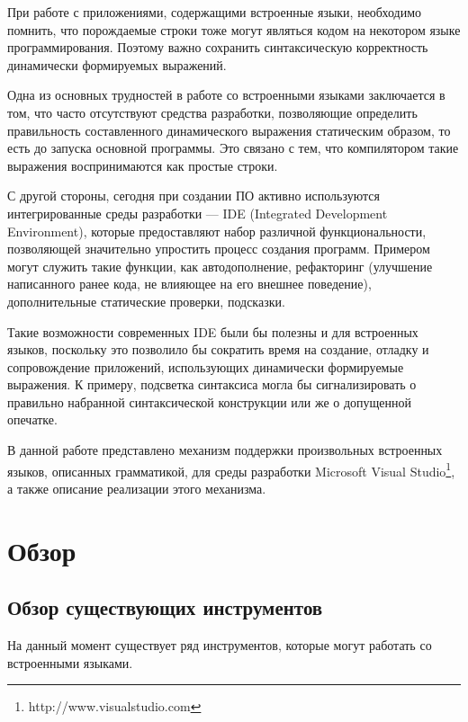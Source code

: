 При работе с приложениями, содержащими встроенные языки, необходимо помнить, что порождаемые строки тоже могут являться кодом на некотором языке программирования. Поэтому важно сохранить синтаксическую корректность динамически формируемых выражений. 

Одна из основных трудностей в работе со встроенными языками заключается в том, что часто отсутствуют средства разработки, позволяющие определить правильность составленного динамического выражения статическим образом, то есть до запуска основной программы. Это связано с тем, что компилятором такие выражения воспринимаются как простые строки.

С другой стороны, сегодня при создании ПО активно используются интегрированные среды разработки --- IDE (Integrated Development Environment), которые предоставляют набор различной функциональности, позволяющей значительно упростить процесс создания программ. Примером могут служить такие функции, как автодополнение, рефакторинг (улучшение написанного ранее кода, не влияющее на его внешнее поведение), дополнительные статические проверки, подсказки. 

Такие возможности современных IDE были бы полезны и для встроенных языков, поскольку это позволило бы сократить время на создание, отладку и сопровождение приложений, использующих динамически формируемые выражения.  К примеру, подсветка синтаксиса могла бы сигнализировать о правильно набранной синтаксической конструкции или же о допущенной опечатке. 

В данной работе представлено механизм поддержки произвольных встроенных языков, описанных грамматикой, для среды разработки Microsoft Visual Studio\footnote{http://www.visualstudio.com}, а также описание реализации этого механизма. 

\section{Обзор}
\subsection{Обзор существующих инструментов}
На данный момент существует ряд инструментов, которые могут работать со встроенными языками. 

